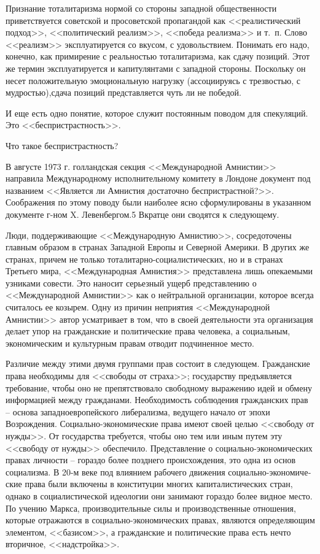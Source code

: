 \documentclass{book}
\begin{document}
Признание тоталитаризма нормой со стороны западной об­щественности приветствуется советской и просоветской про­пагандой как <<реалистический подход>>, <<политический реа­лизм>>, <<победа реализма>> и т.~п. Слово <<реализм>> эксплуати­руется со вкусом, с удовольствием. Понимать его надо, конеч­но, как примирение с реальностью тоталитаризма, как сдачу позиций. Этот же термин эксплуатируется и капитулянтами с западной стороны. Поскольку он несет положительную эмо­циональную нагрузку (ассоциируясь с трезвостью, с мудро­стью),сдача позиций представляется чуть ли не победой.

И еще есть одно понятие, которое служит постоянным пово­дом для спекуляций. Это <<беспристрастность>>.

Что такое беспристрастность?

В августе 1973 г. голландская секция <<Международной Ам­нистии>> направила Международному исполнительному комитету в Лондоне документ под названием <<Является ли Амнистия достаточно беспристрастной?>>. Соображения по этому поводу были наиболее ясно сформулированы в указанном документе г-ном X. Левенбергом.5 Вкратце они сводятся к следующему.

Люди, поддерживающие <<Международную Амнистию>>, сосре­доточены главным образом в странах Западной Европы и Се­верной Америки. В других же странах, причем не только тота­литарно-социалистических, но и в странах Третьего мира, <<Международная Амнистия>> представлена лишь опекаемыми узника­ми совести. Это наносит серьезный ущерб представлению о <<Международной Амнистии>> как о нейтральной организации, которое всегда считалось ее козырем. Одну из причин непри­ятия <<Международной Амнистии>> автор усматривает в том, что в своей деятельности эта организация делает упор на граждан­ские и политические права человека, а социальным, экономи­ческим и культурным правам отводит подчиненное место.

Различие между этими двумя группами прав состоит в сле­дующем. Гражданские права необходимы для <<свободы от страха>>; государству предъявляется требование, чтобы оно не препятствовало свободному выражению идей и обмену информацией между гражданами. Необходимость соблюде­ния гражданских прав -- основа западноевропейского либера­лизма, ведущего начало от эпохи Возрождения. Социально-экономические права имеют своей целью <<свободу от нуж­ды>>. От государства требуется, чтобы оно тем или иным пу­тем эту  <<свободу от нужды>> обеспечило. Представление о социально-экономических правах личности -- гораздо более позднего происхождения, это одна из основ социализма. В 20-м веке под влиянием рабочего движения социально-экономиче­ские права были включены в конституции многих капиталисти­ческих стран, однако в социалистической идеологии они зани­мают гораздо более видное место. По учению Маркса, произ­водительные силы и производственные отношения, которые отражаются в социально-экономических правах, являются определяющим 
элементом, <<базисом>>, а гражданские и поли­тические права есть нечто вторичное, <<надстройка>>.
\end{document}
